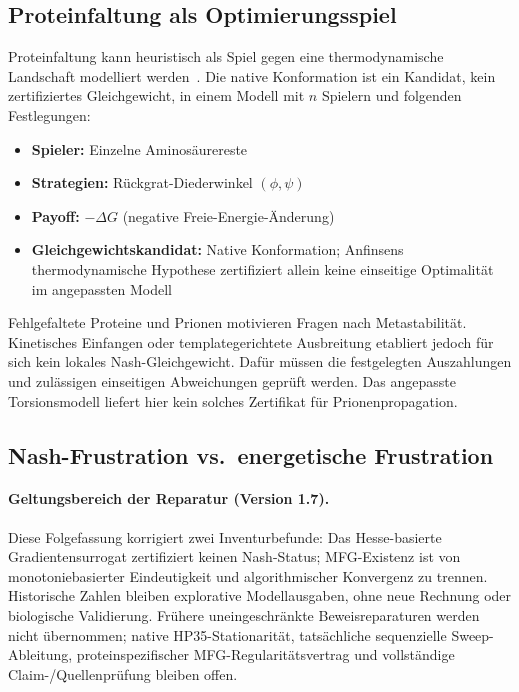 \documentclass[12pt,a4paper]{article}
\theoremstyle{remark}
\begin{document}
\subsection{Proteinfaltung als Optimierungsspiel}

Proteinfaltung kann heuristisch als Spiel gegen eine thermodynamische Landschaft modelliert werden~\citep{EnzymeFolding}. Die native Konformation ist ein Kandidat, kein zertifiziertes Gleichgewicht, in einem Modell mit $n$ Spielern und folgenden Festlegungen:

\begin{itemize}
    \item \textbf{Spieler:} Einzelne Aminosäurereste
    \item \textbf{Strategien:} Rückgrat-Diederwinkel $(\phi, \psi)$
    \item \textbf{Payoff:} $-\Delta G$ (negative Freie-Energie-Änderung)
    \item \textbf{Gleichgewichtskandidat:} Native Konformation; Anfinsens thermodynamische Hypothese zertifiziert allein keine einseitige Optimalität im angepassten Modell~\citep{Anfinsen1973}
\end{itemize}

Fehlgefaltete Proteine und Prionen motivieren Fragen nach Metastabilität. Kinetisches Einfangen oder templategerichtete Ausbreitung etabliert jedoch für sich kein lokales Nash-Gleichgewicht. Dafür müssen die festgelegten Auszahlungen und zulässigen einseitigen Abweichungen geprüft werden. Das angepasste Torsionsmodell liefert hier kein solches Zertifikat für Prionenpropagation.

\subsection{Nash-Frustration vs.\ energetische Frustration}

\paragraph{Geltungsbereich der Reparatur (Version 1.7).}
Diese Folgefassung korrigiert zwei Inventurbefunde: Das Hesse-basierte Gradientensurrogat zertifiziert keinen Nash-Status; MFG-Existenz ist von monotoniebasierter Eindeutigkeit und algorithmischer Konvergenz zu trennen. Historische Zahlen bleiben explorative Modellausgaben, ohne neue Rechnung oder biologische Validierung. Frühere uneingeschränkte \glqq Beweisreparaturen\grqq{} werden nicht übernommen; native HP35-Stationarität, tatsächliche sequenzielle Sweep-Ableitung, proteinspezifischer MFG-Regularitätsvertrag und vollständige Claim-/Quellenprüfung bleiben offen.
\end{document}
